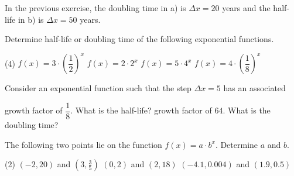 \begin{example}
	In the previous exercise, the doubling time in a) is $\Delta x=20$ years and the half-life in b) is $\Delta x=50$ years.
\end{example}
\begin{exercise}
	Determine half-life or doubling time of the following exponential functions.
	\begin{tasks} (4)
		\task $f\left(x\right)=3\cdot\left(\dfrac{1}{2}\right)^x$
		\task $f\left(x\right)=2\cdot 2^x$
		\task $f\left(x\right)=5\cdot 4^x$
		\task $f\left(x\right)=4\cdot\left(\dfrac{1}{8}\right)^x$
	\end{tasks}
\end{exercise}
\begin{exercise}
	Consider an exponential function such that the step $\Delta x=5$ has an associated
	\begin{tasks}
		\task growth factor of $\dfrac{1}{8}$. What is the half-life?
		\task growth factor of $64$. What is the doubling time?
	\end{tasks}
\end{exercise}
\begin{exercise}
	The following two points lie on the function $f\left(x\right)=a\cdot b^x$.
	Determine $a$ and $b$.
	\begin{tasks}(2)
		\task $\left(-2,20\right)$ and $\left(3,\frac{3}{5}\right)$
		\task $\left(0,2\right)$ and $\left(2,18\right)$
		\task $\left(-4.1,0.004\right)$ and $\left(1.9,0.5\right)$
	\end{tasks}
\end{exercise}
